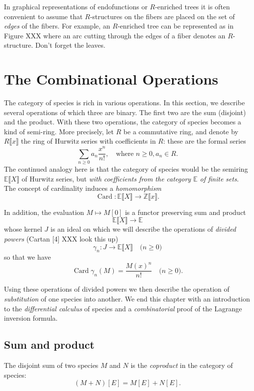 \documentclass{article}
\theoremstyle{definition}
\theoremstyle{remark}
\newcommand{\E}{\mathbb{E}}
\newcommand{\Z}{\mathbb{Z}}
\DeclareMathOperator{\Card}{Card}
\newcommand{\term}[1]{\emph{#1}}
\begin{document}
In graphical representations of endofunctions or $R$-enriched trees it
is often convenient to assume that $R$-structures on the fibers are
placed on the set of \emph{edges} of the fibers.  For example, an
$R$-enriched tree can be represented as in Figure XXX  where an arc cutting through the edges of a fiber denotes an
$R$-structure. Don't forget the leaves.

\section{The Combinational Operations}
\label{sec:combinatorial-operations}

\newcommand{\Poly}[2]{#1 \llbracket #2 \rrbracket}

The category of species is rich in various operations. In this
section, we describe several operations of which three are binary.
The first two are the sum (disjoint) and the product. With these two
operations, the category of species becomes a kind of semi-ring.  More
precisely, let $R$ be a commutative ring, and denote by $\Poly R x$
the ring of Hurwitz series with coefficients in $R$: these are the
formal series
\[ \sum_{n \geq 0} a_n \frac{x^n}{n!}, \quad \text{where $n \geq 0,
  a_n \in R$.} \] The continued analogy here is that the category of
species would be the semiring $\Poly{\E}{X}$ of Hurwitz series, but
\emph{with coefficients from the category $\E$ of finite sets}. The
concept of cardinality induces a \emph{homomorphism}
\[ \Card : \Poly{\E}{X} \to \Poly{\Z}{x}. \]

In addition, the evaluation $M \mapsto M [0]$ is a functor preserving sum and
product
\[ \Poly \E X \to \E \]
whose kernel $J$ is an ideal on which we will describe the operations
of \term{divided powers} (Cartan [4] XXX look this up)
\[ \gamma_n : J \to \Poly \E X \quad \text{($n \geq 0$)} \]
so that we have
\[ \Card \gamma_n(M) = \frac{M(x)^n}{n!} \quad \text{($n \geq 0$)}. \]

Using these operations of divided powers we then describe
the operation of \term{substitution} of one species into another. We end this
chapter with an introduction to the \term{differential calculus} of species
and a \emph{combinatorial} proof of the Lagrange inversion formula.

\subsection{Sum and product}

The disjoint sum of two species $M$ and $N$ is the \emph{coproduct}
in the category of species:
\[ (M + N) [E] = M [E] + N [E]. \]
\end{document}
